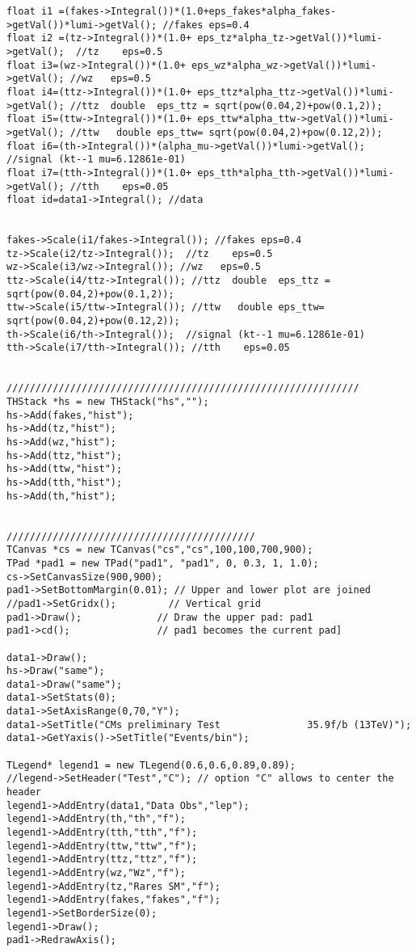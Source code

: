 \begin{verbatim}
float i1 =(fakes->Integral())*(1.0+eps_fakes*alpha_fakes->getVal())*lumi->getVal(); //fakes eps=0.4
float i2 =(tz->Integral())*(1.0+ eps_tz*alpha_tz->getVal())*lumi->getVal();  //tz    eps=0.5
float i3=(wz->Integral())*(1.0+ eps_wz*alpha_wz->getVal())*lumi->getVal(); //wz   eps=0.5
float i4=(ttz->Integral())*(1.0+ eps_ttz*alpha_ttz->getVal())*lumi->getVal(); //ttz  double  eps_ttz = sqrt(pow(0.04,2)+pow(0.1,2));
float i5=(ttw->Integral())*(1.0+ eps_ttw*alpha_ttw->getVal())*lumi->getVal(); //ttw   double eps_ttw= sqrt(pow(0.04,2)+pow(0.12,2));
float i6=(th->Integral())*(alpha_mu->getVal())*lumi->getVal();  //signal (kt--1 mu=6.12861e-01)
float i7=(tth->Integral())*(1.0+ eps_tth*alpha_tth->getVal())*lumi->getVal(); //tth    eps=0.05
float id=data1->Integral(); //data


fakes->Scale(i1/fakes->Integral()); //fakes eps=0.4
tz->Scale(i2/tz->Integral());  //tz    eps=0.5
wz->Scale(i3/wz->Integral()); //wz   eps=0.5
ttz->Scale(i4/ttz->Integral()); //ttz  double  eps_ttz = sqrt(pow(0.04,2)+pow(0.1,2));
ttw->Scale(i5/ttw->Integral()); //ttw   double eps_ttw= sqrt(pow(0.04,2)+pow(0.12,2));
th->Scale(i6/th->Integral());  //signal (kt--1 mu=6.12861e-01)
tth->Scale(i7/tth->Integral()); //tth    eps=0.05


/////////////////////////////////////////////////////////////
THStack *hs = new THStack("hs","");
hs->Add(fakes,"hist");
hs->Add(tz,"hist");
hs->Add(wz,"hist");
hs->Add(ttz,"hist");
hs->Add(ttw,"hist");
hs->Add(tth,"hist");
hs->Add(th,"hist");


///////////////////////////////////////////
TCanvas *cs = new TCanvas("cs","cs",100,100,700,900);
TPad *pad1 = new TPad("pad1", "pad1", 0, 0.3, 1, 1.0);
cs->SetCanvasSize(900,900);
pad1->SetBottomMargin(0.01); // Upper and lower plot are joined
//pad1->SetGridx();         // Vertical grid
pad1->Draw();             // Draw the upper pad: pad1
pad1->cd();               // pad1 becomes the current pad]

data1->Draw();
hs->Draw("same");
data1->Draw("same");
data1->SetStats(0);
data1->SetAxisRange(0,70,"Y");
data1->SetTitle("CMs preliminary Test               35.9f/b (13TeV)");
data1->GetYaxis()->SetTitle("Events/bin");

TLegend* legend1 = new TLegend(0.6,0.6,0.89,0.89);
//legend->SetHeader("Test","C"); // option "C" allows to center the header
legend1->AddEntry(data1,"Data Obs","lep");
legend1->AddEntry(th,"th","f");
legend1->AddEntry(tth,"tth","f");
legend1->AddEntry(ttw,"ttw","f");
legend1->AddEntry(ttz,"ttz","f");
legend1->AddEntry(wz,"Wz","f");
legend1->AddEntry(tz,"Rares SM","f");
legend1->AddEntry(fakes,"fakes","f");
legend1->SetBorderSize(0);
legend1->Draw();
pad1->RedrawAxis();



\end{verbatim}
